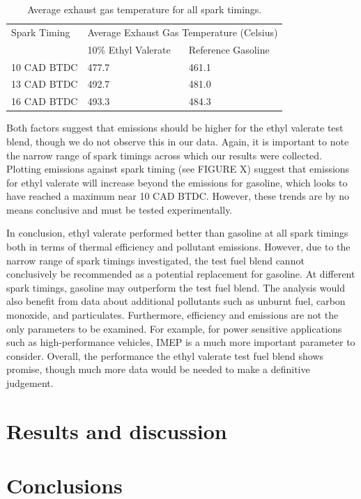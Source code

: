 \documentclass[11pt]{article}
\begin{document}
\begin{table}[H]
	\begin{center}
	\begin{tabular}{@{}lll@{}}
		\toprule
		Spark Timing & \multicolumn{2}{c}{Average Exhaust Gas Temperature (Celsius)} \\
		\cmidrule{2-3} & 10\% Ethyl Valerate & Reference Gasoline \\
		\midrule
		10 CAD BTDC & 477.7 & 461.1 \\
		13 CAD BTDC & 492.7 & 481.0 \\
		16 CAD BTDC & 493.3 & 484.3 \\
		\bottomrule
	\end{tabular}
	\caption{Average exhaust gas temperature for all spark timings.}
	\label{q7-t1}
	\end{center}
\end{table}
Both factors suggest that  emissions should be higher for the ethyl valerate test blend, though we do not observe this in our data. Again, it is important to note the narrow range of spark timings across which our results were collected. Plotting  emissions against spark timing (see FIGURE X) suggest that  emissions for ethyl valerate will increase beyond the  emissions for gasoline, which looks to have reached a maximum near 10 CAD BTDC. However, these trends are by no means conclusive and must be tested experimentally.

In conclusion, ethyl valerate performed better than gasoline at all spark timings both in terms of thermal efficiency and pollutant emissions. However, due to the narrow range of spark timings investigated, the test fuel blend cannot conclusively be recommended as a potential replacement for gasoline. At different spark timings, gasoline may outperform the test fuel blend. The analysis would also benefit from data about additional pollutants such as unburnt fuel, carbon monoxide, and particulates. Furthermore, efficiency and emissions are not the only parameters to be examined. For example, for power sensitive applications such as high-performance vehicles, IMEP is a much more important parameter to consider. Overall, the performance the ethyl valerate test fuel blend shows promise, though much more data would be needed to make a definitive judgement. 
\section{Results and discussion}
\section{Conclusions}
\begin{thebibliography}{00}

\end{thebibliography}
\end{document}
